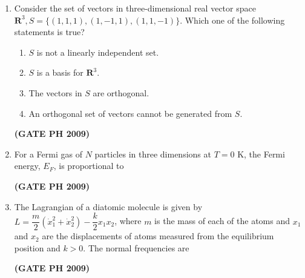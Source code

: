 \documentclass[14pt, a4paper]{extarticle}
\begin{document}
\begin{enumerate}[label=\textbf{Q. \arabic*}, start=21]
\item Consider the set of vectors in three-dimensional real vector space $\mathbf{R}^3, S = \{(1,1,1), (1,-1,1), (1,1,-1)\}$. Which one of the following statements is true?
\begin{enumerate}
\item $S$ is not a linearly independent set.
\item $S$ is a basis for $\mathbf{R}^3$.
\item The vectors in $S$ are orthogonal.
\item An orthogonal set of vectors cannot be generated from $S$.
\end{enumerate}
\hfill \textbf{(GATE PH 2009)}

\item For a Fermi gas of $N$ particles in three dimensions at $T=0$ K, the Fermi energy, $E_F$, is proportional to
\begin{enumerate}
\end{enumerate}
\hfill \textbf{(GATE PH 2009)}

\item The Lagrangian of a diatomic molecule is given by $L = \dfrac{m}{2}(\dot{x}_1^2 + \dot{x}_2^2) - \dfrac{k}{2}x_1 x_2$, where $m$ is the mass of each of the atoms and $x_1$ and $x_2$ are the displacements of atoms measured from the equilibrium position and $k > 0$. The normal frequencies are
\begin{enumerate}
\end{enumerate}
\hfill \textbf{(GATE PH 2009)}


\end{enumerate}
\end{document}

